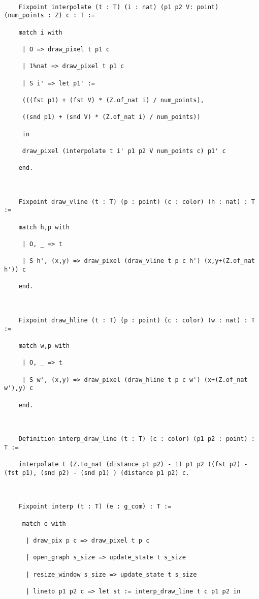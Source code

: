 \documentclass{llncs}
\begin{document}
 \begin{lstlisting}

    Fixpoint interpolate (t : T) (i : nat) (p1 p2 V: point) (num_points : Z) c : T :=

    match i with

     | O => draw_pixel t p1 c

     | 1%nat => draw_pixel t p1 c

     | S i' => let p1' :=

     (((fst p1) + (fst V) * (Z.of_nat i) / num_points),

     ((snd p1) + (snd V) * (Z.of_nat i) / num_points))

     in

     draw_pixel (interpolate t i' p1 p2 V num_points c) p1' c 

    end.



    Fixpoint draw_vline (t : T) (p : point) (c : color) (h : nat) : T :=

    match h,p with

     | O, _ => t

     | S h', (x,y) => draw_pixel (draw_vline t p c h') (x,y+(Z.of_nat h')) c

    end.



    Fixpoint draw_hline (t : T) (p : point) (c : color) (w : nat) : T :=

    match w,p with

     | O, _ => t

     | S w', (x,y) => draw_pixel (draw_hline t p c w') (x+(Z.of_nat w'),y) c

    end.



    Definition interp_draw_line (t : T) (c : color) (p1 p2 : point) : T :=

    interpolate t (Z.to_nat (distance p1 p2) - 1) p1 p2 ((fst p2) - (fst p1), (snd p2) - (snd p1) ) (distance p1 p2) c.

  

    Fixpoint interp (t : T) (e : g_com) : T :=

     match e with

      | draw_pix p c => draw_pixel t p c

      | open_graph s_size => update_state t s_size

      | resize_window s_size => update_state t s_size 

      | lineto p1 p2 c => let st := interp_draw_line t c p1 p2 in 


\end{lstlisting}
\end{document}
